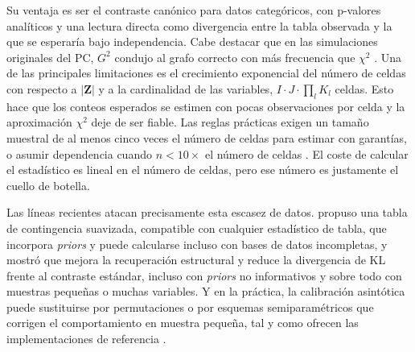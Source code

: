 Su ventaja es ser el contraste canónico para datos categóricos, con p-valores analíticos y una lectura directa como divergencia entre la tabla observada y la que se esperaría bajo independencia. Cabe destacar que en las simulaciones originales del PC, $G^2$ condujo al grafo correcto con más frecuencia que $\chi^2$ \citep{spirtes2000causation}. Una de las principales limitaciones es el crecimiento exponencial del número de celdas  con respecto a $|\mathbf{Z}|$ y a la cardinalidad de las variables, $I \cdot J \cdot \prod_l K_l$ celdas. Esto hace que los conteos esperados se estimen con pocas observaciones por celda y la aproximación
$\chi^2$ deje de ser fiable. Las reglas prácticas exigen un tamaño muestral de al menos cinco veces el número de celdas para estimar con garantías, o asumir dependencia cuando $n < 10\times$ el número de celdas \citep{spirtes2000causation}. El coste de calcular el estadístico es lineal en el número de celdas, pero ese número es justamente el cuello de botella.

Las líneas recientes atacan precisamente esta escasez de datos. \citet{dash2003robust} propuso una tabla de contingencia suavizada, compatible con cualquier estadístico de tabla, que incorpora \emph{priors} y puede calcularse incluso con bases de datos incompletas, y mostró que mejora la recuperación estructural y reduce la divergencia de KL frente al contraste estándar, incluso con \emph{priors} no informativos y sobre todo con muestras pequeñas o muchas variables. Y en la práctica, la calibración asintótica puede sustituirse por permutaciones o por esquemas semiparamétricos que corrigen el comportamiento en muestra pequeña, tal y como ofrecen las implementaciones de referencia \citep{scutari2010bnlearn, tsamardinos2010permutation}.

